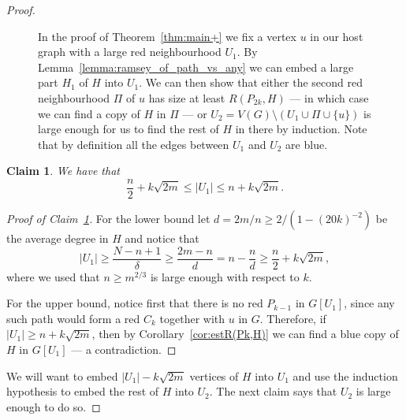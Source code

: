 \documentclass{article}
\newtheorem{claim}[theorem]{Claim}
\newcommand*{\myproofname}{Proof}
\newenvironment{claimproof}[1][\myproofname]{\begin{proof}[#1]\renewcommand*{\qedsymbol}{\(\diamondsuit\)}}{\end{proof}}
\begin{document}
\begin{proof}
\begin{figure}
        \caption{
        In the proof of Theorem~\ref{thm:main+} we fix a vertex $u$ in our host graph with a large red neighbourhood $U_1$.
        By Lemma~\ref{lemma:ramsey_of_path_vs_any} we can embed a large part $H_1$ of $H$ into $U_1$.
        We can then show that either the second red neighbourhood $\Pi$ of $u$ has size at least $R(P_{2k}, H)$ --- in which case we can find a copy of $H$ in $\Pi$ --- or $U_2 = V(G) \setminus(U_1 \cup \Pi \cup \{u \})$ is large enough for us to find the rest of $H$ in there by induction.
        Note that by definition all the edges between $U_1$ and $U_2$ are blue.
    }

        \label{fig:mainproof}
\end{figure}

    \begin{claim}\label{claim:U_1bound}
        We have that
        \[
            \frac{n}{2} + k\sqrt{2m} \leq |U_1| \leq n + k\sqrt{2m}.
        \]
    \end{claim}
    \begin{claimproof}[Proof of Claim~\ref{claim:U_1bound}]
        For the lower bound let $d = 2m/n \geq 2 / (1 - (20k)^{-2})$ be the average degree in $H$ and notice that
        \[
            |U_1| \geq \frac{N - n + 1}{\delta} \geq \frac{2m  - n}{d} = n - \frac{n}{d} \geq \frac{n}{2} + k\sqrt{2m},
        \]
        where we used that $n \geq m^{2/3}$ is large enough with respect to $k$.

        For the upper bound, notice first that there is no red $P_{k-1}$ in $G[U_1]$, since any such path would form a red $C_k$ together with $u$ in $G$.
        Therefore, if $|U_1| \geq n + k\sqrt{2m}$, then by Corollary~\ref{cor:estR(Pk,H)} we can find a blue copy of $H$ in $G[U_1]$ --- a contradiction.
    \end{claimproof}

    We will want to embed $|U_1| - k\sqrt{2m}$ vertices of $H$ into $U_1$ and use the induction hypothesis to embed the rest of $H$ into $U_2$.
    The next claim says that  $U_2$ is large enough to do so.


\end{proof}
\end{document}
